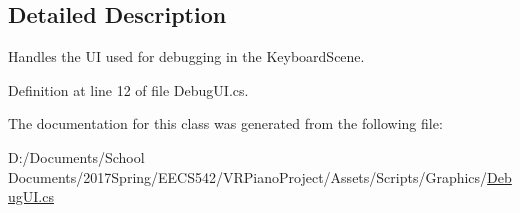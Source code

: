 \subsection{Detailed Description}
Handles the UI used for debugging in the Keyboard\+Scene. 

Definition at line 12 of file Debug\+U\+I.\+cs.



The documentation for this class was generated from the following file\+:\begin{DoxyCompactItemize}
\item 
D\+:/\+Documents/\+School Documents/2017\+Spring/\+E\+E\+C\+S542/\+V\+R\+Piano\+Project/\+Assets/\+Scripts/\+Graphics/\hyperlink{_debug_u_i_8cs}{Debug\+U\+I.\+cs}\end{DoxyCompactItemize}
